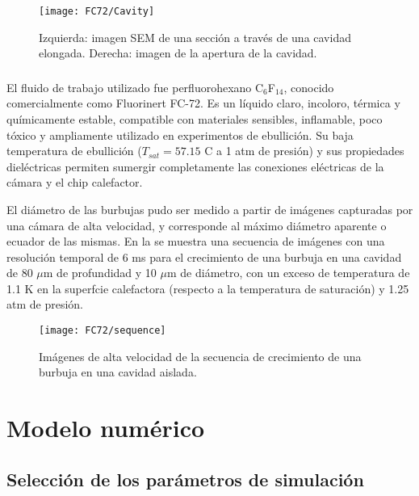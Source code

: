 \begin{figure}[ht]
	\centering
	\texttt{[image: FC72/Cavity]}
	\caption{Izquierda: imagen SEM de una secci\'on a trav\'es de una cavidad elongada. Derecha: imagen de la apertura de la cavidad.}
	\label{fig:cavidad}
\end{figure}


\subsubsection{}

El fluido de trabajo utilizado fue perfluorohexano C$_6$F$_14$, conocido comercialmente como Fluorinert FC-72. Es un l\'iquido claro, incoloro, t\'ermica y qu\'imicamente estable, compatible con materiales sensibles, inflamable, poco t\'oxico y ampliamente utilizado en experimentos de ebullici\'on. Su baja temperatura de ebullici\'on ($T_{sat}=57.15$ \textordmasculine C a 1 atm de presi\'on) y sus propiedades diel\'ectricas permiten sumergir completamente las conexiones el\'ectricas de la c\'amara y el chip calefactor.  


El di\'ametro de las burbujas pudo ser medido a partir de im\'agenes capturadas por una c\'amara de alta velocidad, y corresponde al m\'aximo di\'ametro aparente o ecuador de las mismas. En la  se muestra una secuencia de im\'agenes con una resoluci\'on temporal de 6 ms para el crecimiento de una burbuja en una cavidad de 80 $\mu$m de profundidad y 10 $\mu$m de di\'ametro, con un exceso de temperatura de 1.1 K en la superfcie calefactora (respecto a la temperatura de saturaci\'on) y 1.25 atm de presi\'on.

\begin{figure}[ht]
	\centering
	\texttt{[image: FC72/sequence]}
	\caption{Im\'agenes de alta velocidad de la secuencia de crecimiento de una burbuja en una cavidad aislada.}
	\label{fig:sequence}
\end{figure}





\section{Modelo num\'erico}

\subsection{Selecci\'on de los par\'ametros de simulaci\'on}

